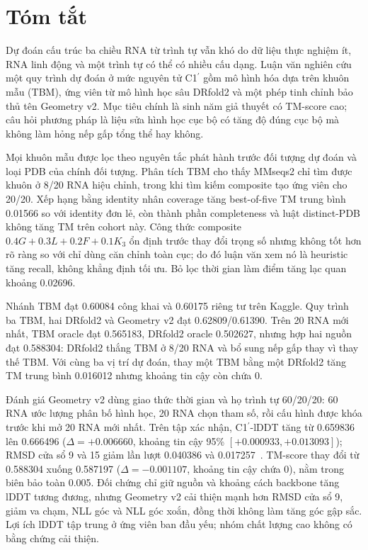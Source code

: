 \documentclass[12pt,a4paper,oneside]{report}
\newcommand{\cprime}{C1$^{\prime}$}
\newcommand{\angstrom}{\text{\AA}}
\begin{document}
\chapter*{Tóm tắt}

Dự đoán cấu trúc ba chiều RNA từ trình tự vẫn khó do dữ liệu thực nghiệm ít, RNA linh
động và một trình tự có thể có nhiều cấu dạng. Luận văn nghiên cứu một quy trình dự
đoán ở mức nguyên tử \cprime{} gồm mô hình hóa dựa trên khuôn mẫu (TBM), ứng viên từ
mô hình học sâu DRfold2 và một phép tinh chỉnh bảo thủ tên Geometry v2. Mục tiêu chính
là sinh năm giả thuyết có TM-score cao; câu hỏi phương pháp là liệu sửa hình học cục bộ
có tăng độ đúng cục bộ mà không làm hỏng nếp gấp tổng thể hay không.

Mọi khuôn mẫu được lọc theo nguyên tắc phát hành trước đối tượng dự đoán và loại PDB của
chính đối tượng. Phân tích TBM cho thấy MMseqs2 chỉ tìm được khuôn ở 8/20 RNA hiệu chỉnh,
trong khi tìm kiếm composite tạo ứng viên cho 20/20. Xếp hạng bằng identity nhân coverage
tăng best-of-five TM trung bình 0.01566 so với identity đơn lẻ, còn thành phần
completeness và luật distinct-PDB không tăng TM trên cohort này. Công thức composite
$0.4G+0.3L+0.2F+0.1K_3$ ổn định trước thay đổi trọng số nhưng không tốt hơn rõ ràng
so với chỉ dùng căn chỉnh toàn cục; do đó luận văn xem nó là heuristic tăng recall,
không khẳng định tối ưu. Bỏ lọc thời gian làm điểm tăng lạc quan khoảng 0.02696.

Nhánh TBM đạt 0.60084 công khai và 0.60175 riêng tư trên Kaggle. Quy trình ba TBM, hai
DRfold2 và Geometry v2 đạt 0.62809/0.61390. Trên 20 RNA mới nhất, TBM oracle đạt
0.565183, DRfold2 oracle 0.502627, nhưng hợp hai nguồn đạt 0.588304: DRfold2 thắng TBM
ở 8/20 RNA và bổ sung nếp gấp thay vì thay thế TBM. Với cùng ba vị trí dự đoán, thay một
TBM bằng một DRfold2 tăng TM trung bình 0.016012 nhưng khoảng tin cậy còn chứa 0.

Đánh giá Geometry v2 dùng giao thức thời gian và họ trình tự 60/20/20: 60 RNA ước lượng
phân bố hình học, 20 RNA chọn tham số, rồi cấu hình được khóa trước khi mở 20 RNA mới
nhất. Trên tập xác nhận, \cprime{}-lDDT tăng từ 0.659836 lên 0.666496
($\Delta=+0.006660$, khoảng tin cậy 95\% $[+0.000933,+0.013093]$); RMSD cửa sổ 9 và
15 giảm lần lượt 0.040386 và 0.017257~\angstrom. TM-score thay đổi từ 0.588304 xuống
0.587197 ($\Delta=-0.001107$, khoảng tin cậy chứa 0), nằm trong biên bảo toàn 0.005.
Đối chứng chỉ giữ nguồn và khoảng cách backbone tăng lDDT tương đương, nhưng Geometry
v2 cải thiện mạnh hơn RMSD cửa sổ 9, giảm va chạm, NLL góc và NLL góc xoắn, đồng thời
không làm tăng góc gập sắc. Lợi ích lDDT tập trung ở ứng viên ban đầu yếu; nhóm chất
lượng cao không có bằng chứng cải thiện.
\end{document}

